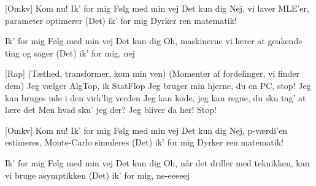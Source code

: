 \documentclass[a4paper,11pt]{article}
\begin{document}
\begin{song}
  [Omkv]%
  Kom nu!
  Ik' for mig
  Følg med min vej
  Det kun dig
  Nej, vi laver MLE'er, parameter optimerer
  (Det) ik' for mig
  				 Dyrker ren matematik!
  
  Ik' for mig
  Følg med min vej
  Det kun dig
  Oh, maskinerne vi lærer at genkende ting og sager
  (Det) ik' for mig, nej
  
  [Rap]%
  (Tæthed, transformer, kom min ven)
  				(Momenter af fordelinger, vi finder dem)
  Jeg vælger AlgTop, ik StatFlop
  				Jeg bruger min hjerne, du en PC, stop!
  Jeg kan bruges ude i den virk'lig verden
  				Jeg kan kode, jeg kan regne, du sku tag' at lære det
  Men hvad sku' jeg der? Jeg bliver da her!
  				Stop! 
  				

  [Omkv]%
  Kom nu!
  Ik' for mig
  Følg med min vej
  Det kun dig
  Nej, p-værdi'en estimeres, Monte-Carlo simuleres
  (Det) ik' for mig
  				 Dyrker ren matematik!
  
  Ik' for mig
  Følg med min vej
  Det kun dig
  Oh, når det driller med teknikken, kan vi bruge asymptikken
  (Det) ik' for mig, ne-eeeeej
  
\end{song}
\end{document}
